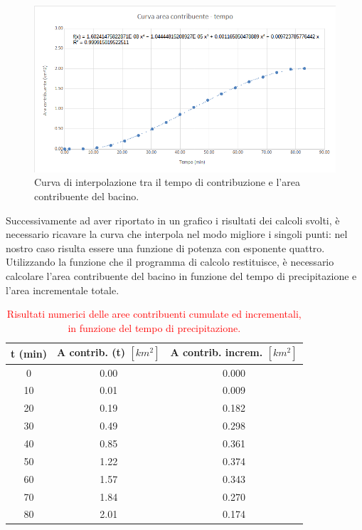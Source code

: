 \begin{figure}[H]  \centering
        \includegraphics[scale=0.6]{immagini/curva_area_contribuente_tempo.png}
        \caption{Curva di interpolazione tra il tempo di contribuzione e l'area contribuente del bacino.}
        \label{curva_area_contribuente_tempo}
\end{figure}
Successivamente ad aver riportato in un grafico i risultati dei calcoli svolti, è necessario ricavare la curva che interpola nel modo migliore i singoli punti: nel nostro caso risulta essere una funzione di potenza con esponente quattro.\\
Utilizzando la funzione che il programma di calcolo restituisce, è necessario calcolare l'area contribuente del bacino in funzione del tempo di precipitazione e l'area incrementale totale.
\begin{table}[H] \centering
    \caption{\textcolor{red}{Risultati numerici delle aree contribuenti cumulate ed incrementali, in funzione del tempo di precipitazione.}}
    \begin{tabular}{ccc}
    \toprule
    t (min) & A contrib. (t) $[km^2]$& A contrib. increm. $[km^2]$\\
\midrule
    0       & 0.00               & 0.000                       \\
    10      & 0.01               & 0.009                       \\
    20      & 0.19               & 0.182                       \\
    30      & 0.49               & 0.298                       \\
    40      & 0.85               & 0.361                       \\
    50      & 1.22               & 0.374                       \\
    60      & 1.57               & 0.343                       \\
    70      & 1.84               & 0.270                       \\
    80      & 2.01               & 0.174                       \\
 \bottomrule
 \end{tabular}
 \end{table} 

